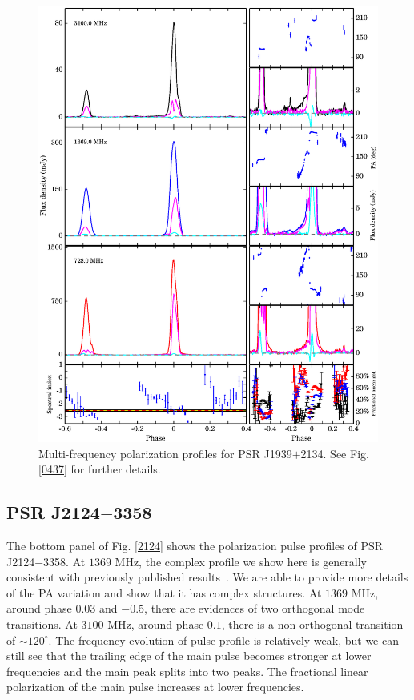 \documentclass[useAMS,usenatbib]{mn2e}
\begin{document}
\begin{figure}
\begin{center}
\includegraphics[width=6 in]{1939.ps}
\caption{Multi-frequency polarization profiles for PSR J1939$+$2134. 
See Fig. \ref{0437} for further details.}
\label{1939}
\end{center}
\end{figure}



\subsection{PSR J2124$-$3358}

The bottom panel of Fig. \ref{2124} shows the polarization pulse profiles of 
PSR J2124$-$3358.
%
At $1369$ MHz, the complex profile we show here is generally consistent with 
previously published results~\citep{Yan11}.
%
We are able to provide more details of the PA variation and show that it has 
complex structures.
%
At $1369$ MHz, around phase $0.03$ and $-0.5$, there are evidences of two 
orthogonal mode transitions.
%
At $3100$ MHz, around phase $0.1$, there is a non-orthogonal transition of 
$\sim120^{\circ}$.
%
The frequency evolution of pulse profile is relatively weak, but we can 
still see that the trailing edge of the main pulse becomes stronger at 
lower frequencies and the main peak splits into two peaks.
%
The fractional linear polarization of the main pulse increases at lower 
frequencies.
\end{document}
